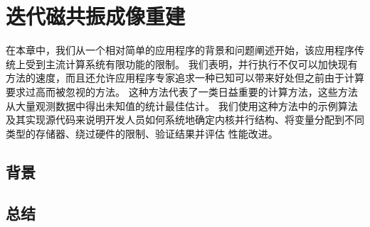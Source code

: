 \section{迭代磁共振成像重建}
在本章中，我们从一个相对简单的应用程序的背景和问题阐述开始，该应用程序传统上受到主流计算系统有限功能的限制。 我们表明，并行执行不仅可以加快现有方法的速度，而且还允许应用程序专家追求一种已知可以带来好处但之前由于计算要求过高而被忽视的方法。 这种方法代表了一类日益重要的计算方法，这些方法从大量观测数据中得出未知值的统计最佳估计。 我们使用这种方法中的示例算法及其实现源代码来说明开发人员如何系统地确定内核并行结构、将变量分配到不同类型的存储器、绕过硬件的限制、验证结果并评估 性能改进。

\subsection{背景}

\subsection{总结}